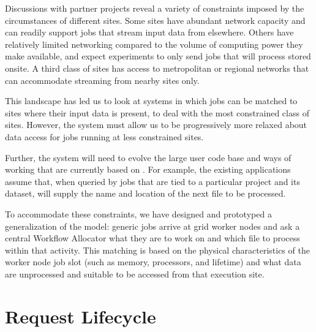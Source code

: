 \documentclass[../main-v1.tex]{subfiles}
\begin{document}
Discussions with partner projects reveal a variety of constraints imposed by the circumstances of different sites. Some sites have 
abundant network capacity and can readily support jobs that stream input data from elsewhere. Others have relatively limited networking
compared to the volume of computing power they make available, and
expect experiments to only send jobs that will process %
stored onsite. A third class of sites has access to metropolitan or 
regional networks that can accommodate streaming from nearby sites only.

This landscape has led us to look at %
systems in which jobs can be matched to sites where their input data is present, to deal with the most constrained class of sites. %
However, the system must allow us to be progressively more relaxed about data access for jobs running at %
less constrained sites. %
 

Further, the system will need to evolve the large user code base and ways of working that are currently based on . For example, the %
existing applications assume that, when queried by jobs that are tied to a particular  project and its dataset,  will supply the name and location of the next file to be processed. 

To accommodate %
these constraints, we have designed and prototyped a generalization of the  model: generic jobs arrive at grid worker nodes and ask a central Workflow Allocator what they are to work on and which file to process within that activity. This matching is based on the physical characteristics of the worker node job slot (such as memory, processors, and lifetime) and what data are unprocessed and suitable to be accessed from that execution site. 


\section{Request Lifecycle}
\label{sec:flow:lifecycle}
\end{document}
